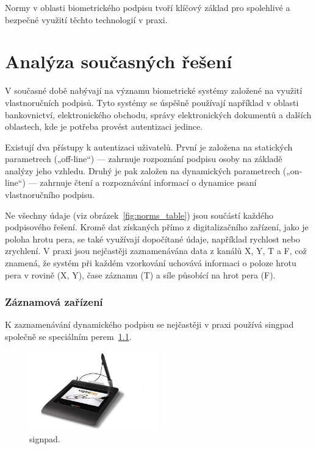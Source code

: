 Normy v oblasti biometrického podpisu tvoří klíčový základ pro spolehlivé a bezpečné využití těchto technologií v praxi.


\chapter{Analýza současných řešení}

V současné době nabývají na významu biometrické systémy založené na využití vlastnoručních podpisů. 
Tyto systémy se úspěšně používají například v oblasti bankovnictví, elektronického obchodu, správy elektronických dokumentů a dalších oblastech, kde je potřeba provést autentizaci jedince. 

Existují dva přístupy k autentizaci uživatelů.
První je založena na statických parametrech („off-line“) --- zahrnuje rozpoznání podpisu osoby na základě analýzy jeho vzhledu.
Druhý je pak založen na dynamických parametrech („on-line“) --- zahrnuje čtení a rozpoznávání informací o dynamice psaní vlastnoručního podpisu.~\cite{9306154} %

Ne všechny údaje (viz obrázek~\ref{fig:norms_table}) jsou součástí každého podpisového řešení. 
Kromě dat získaných přímo z digitalizačního zařízení, jako je poloha hrotu pera, se také využívají dopočítané údaje, například rychlost nebo zrychlení. 
V praxi jsou nejčastěji zaznamenávána data z kanálů X, Y, T a F, což znamená, že systém při každém vzorkování uchovává informaci o poloze hrotu pera v rovině (X, Y), čase záznamu (T) a síle působící na hrot pera (F).~\cite{DSM2021b}

\subsection*{Záznamová zařízení}
K zaznamenávání dynamického podpisu se nejčastěji v praxi používá singpad společně se speciálním perem~\ref{fig:signpad}.

\begin{figure}[h]
  \centering
  \includegraphics[width=0.5\textwidth]{obrazky-figures/signpad.jpg}
  \caption{signpad.~\cite{SignPadImage}} %
  \label{fig:signpad}
\end{figure}

